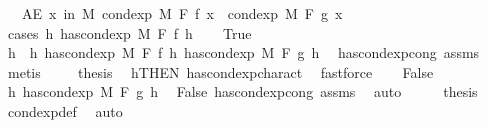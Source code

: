 \begin{isabellebody}
\ \ \ {\isachardoublequoteopen}AE\ x\ in\ M{\isachardot}{\kern0pt}\ cond{\isacharunderscore}{\kern0pt}exp\ M\ F\ f\ x\ {\isacharequal}{\kern0pt}\ cond{\isacharunderscore}{\kern0pt}exp\ M\ F\ g\ x{\isachardoublequoteclose}\isanewline
%
\isadelimproof
%
\endisadelimproof
%
\isatagproof
{}\isamarkupfalse%
\ {\isacharparenleft}{\kern0pt}cases\ {\isachardoublequoteopen}{\isasymexists}h{\isachardot}{\kern0pt}\ has{\isacharunderscore}{\kern0pt}cond{\isacharunderscore}{\kern0pt}exp\ M\ F\ f\ h{\isachardoublequoteclose}{\isacharparenright}{\kern0pt}\isanewline
\ \ \isamarkupfalse%
\ True\isanewline
\ \ \isamarkupfalse%
\ \isamarkupfalse%
\ h\ \ h{\isacharcolon}{\kern0pt}\ {\isachardoublequoteopen}has{\isacharunderscore}{\kern0pt}cond{\isacharunderscore}{\kern0pt}exp\ M\ F\ f\ h{\isachardoublequoteclose}\ {\isachardoublequoteopen}has{\isacharunderscore}{\kern0pt}cond{\isacharunderscore}{\kern0pt}exp\ M\ F\ g\ h{\isachardoublequoteclose}\ \isamarkupfalse%
\ has{\isacharunderscore}{\kern0pt}cond{\isacharunderscore}{\kern0pt}exp{\isacharunderscore}{\kern0pt}cong\ assms\ \isamarkupfalse%
\ metis\ \isanewline
\ \ \isamarkupfalse%
\ {\isacharquery}{\kern0pt}thesis\ \isamarkupfalse%
\ h{\isacharbrackleft}{\kern0pt}THEN\ has{\isacharunderscore}{\kern0pt}cond{\isacharunderscore}{\kern0pt}exp{\isacharunderscore}{\kern0pt}charact{\isacharparenleft}{\kern0pt}{}{\isacharparenright}{\kern0pt}{\isacharbrackright}{\kern0pt}\ \isamarkupfalse%
\ fastforce\isanewline
{}\isamarkupfalse%
\isanewline
\ \ \isamarkupfalse%
\ False\isanewline
\ \ \isamarkupfalse%
\ \isamarkupfalse%
\ {\isachardoublequoteopen}{\isasymnexists}h{\isachardot}{\kern0pt}\ has{\isacharunderscore}{\kern0pt}cond{\isacharunderscore}{\kern0pt}exp\ M\ F\ g\ h{\isachardoublequoteclose}\ \isamarkupfalse%
\ False\ has{\isacharunderscore}{\kern0pt}cond{\isacharunderscore}{\kern0pt}exp{\isacharunderscore}{\kern0pt}cong\ assms\ \isamarkupfalse%
\ auto\isanewline
\ \ \isamarkupfalse%
\ \isamarkupfalse%
\ {\isacharquery}{\kern0pt}thesis\ \isamarkupfalse%
\ cond{\isacharunderscore}{\kern0pt}exp{\isacharunderscore}{\kern0pt}def\ \isamarkupfalse%
\ auto\isanewline
{}\isamarkupfalse%
%
\endisatagproof
{\isafoldproof}%
%
\isadelimproof
\isanewline

\end{isabellebody}
